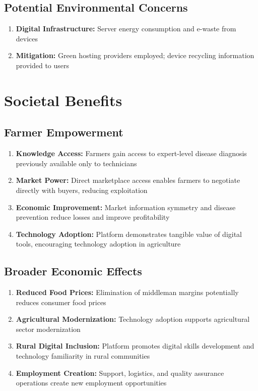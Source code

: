 \documentclass[12pt,a4paper]{report}
\begin{document}
\subsection{Potential Environmental Concerns}

\begin{enumerate}
    \item \textbf{Digital Infrastructure:} Server energy consumption and e-waste from devices
    \item \textbf{Mitigation:} Green hosting providers employed; device recycling information provided to users
\end{enumerate}

\section{Societal Benefits}

\subsection{Farmer Empowerment}

\begin{enumerate}
    \item \textbf{Knowledge Access:} Farmers gain access to expert-level disease diagnosis previously available only to technicians
    \item \textbf{Market Power:} Direct marketplace access enables farmers to negotiate directly with buyers, reducing exploitation
    \item \textbf{Economic Improvement:} Market information symmetry and disease prevention reduce losses and improve profitability
    \item \textbf{Technology Adoption:} Platform demonstrates tangible value of digital tools, encouraging technology adoption in agriculture
\end{enumerate}

\subsection{Broader Economic Effects}

\begin{enumerate}
    \item \textbf{Reduced Food Prices:} Elimination of middleman margins potentially reduces consumer food prices
    \item \textbf{Agricultural Modernization:} Technology adoption supports agricultural sector modernization
    \item \textbf{Rural Digital Inclusion:} Platform promotes digital skills development and technology familiarity in rural communities
    \item \textbf{Employment Creation:} Support, logistics, and quality assurance operations create new employment opportunities
\end{enumerate}
\end{document}
